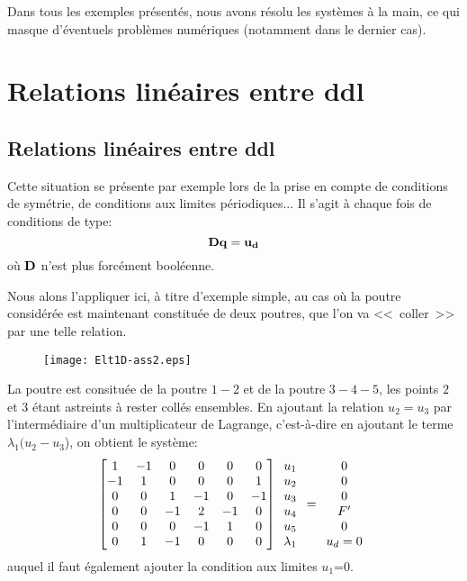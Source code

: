 \medskip
Dans tous les exemples présentés, nous avons résolu les systèmes à la main, ce qui masque d'éventuels
problèmes numériques (notamment dans le dernier cas).

\medskip
\ifVersionAvecExemplesSepares
   \section{Relations linéaires entre ddl}
\else
   \subsection{Relations linéaires entre ddl}
\fi
Cette situation se présente par exemple lors de la prise en compte de conditions de symétrie, de conditions aux limites périodiques... Il s'agit à chaque fois de conditions de type:
\begin{equation}
\mathbf{D}\mathbf{q} = \mathbf{u_d}
\end{equation}
où $\mathbf{D}$ n'est plus forcément booléenne.

\medskip
Nous alons l'appliquer ici, à titre d'exemple simple, au cas où la poutre considérée est maintenant constituée de deux poutres, que l'on va <<~coller~>> par une telle relation.
\begin{figure}[ht]
\centering
\texttt{[image: Elt1D-ass2.eps]}
\end{figure}
La poutre est consituée de la poutre $1-2$ et de la poutre $3-4-5$, les points $2$ et $3$ étant astreints à rester collés ensembles.
\medskipvm
En ajoutant la relation $u_2=u_3$ par l'intermédiaire d'un multiplicateur de Lagrange, c'est-à-dire en ajoutant le terme $\lambda_1(u_2-u_3$), on obtient le système:
\begin{equation}
\begin{bmatrix}1&-1&0&0&0&0 \\ -1&1&0&0&0&1 \\ 0&0&1&-1&0&-1\\ 0&0&-1&2&-1&0\\ 0&0&0&-1&1&0 \\ 0&1&-1&0&0&0
\end{bmatrix}
\mathbf{\begin{array}{c} u_1\\u_2\\u_3\\u_4\\ u_5\\ \lambda_1 \end{array}}
=
\mathbf{\begin{array}{c} 0\\0\\0\\F' \\ 0 \\ u_d=0\end{array}}
\end{equation}
auquel il faut également ajouter la condition aux limites $u_1$=0.

